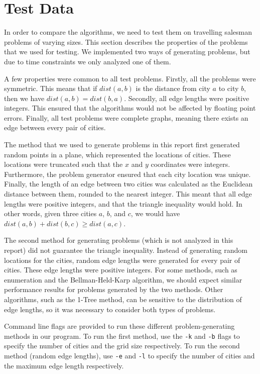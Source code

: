\documentclass[11pt]{article}
\begin{document}
\section{Test Data}
\label{sec:data}

In order to compare the algorithms, we need to test them on travelling salesman problems of varying sizes. This section describes the properties of the problems that we used for testing. We implemented two ways of generating problems, but due to time constraints we only analyzed one of them.

A few properties were common to all test problems. Firstly, all the problems were symmetric. This means that if $dist(a,b)$ is the distance from city $a$ to city $b$, then we have $dist(a,b) = dist(b,a)$. Secondly, all edge lengths were positive integers. This ensured that the algorithms would not be affected by floating point errors. Finally, all test problems were complete graphs, meaning there exists an edge between every pair of cities.

The method that we used to generate problems in this report first generated random points in a plane, which represented the locations of cities. These locations were truncated such that the $x$ and $y$ coordinates were integers. Furthermore, the problem generator ensured that each city location was unique. Finally, the length of an edge between two cities was calculated as the Euclidean distance between them, rounded to the nearest integer. This meant that all edge lengths were positive integers, and that the triangle inequality would hold. In other words, given three cities $a$, $b$, and $c$, we would have $dist(a,b) + dist(b,c) \geq dist(a,c)$.

The second method for generating problems (which is not analyzed in this report) did not guarantee the triangle inequality. Instead of generating random locations for the cities, random edge lengths were generated for every pair of cities. These edge lengths were positive integers. For some methods, such as enumeration and the Bellman-Held-Karp algorithm, we should expect similar performance results for problems generated by the two methods. Other algorithms, such as the 1-Tree method, can be sensitive to the distribution of edge lengths, so it was necessary to consider both types of problems.

Command line flags are provided to run these different problem-generating methods in our program. To run the first method, use the \texttt{-k} and \texttt{-b} flags to specify the number of cities and the grid size respectively. To run the second method (random edge lengths), use \texttt{-e} and \texttt{-l} to specify the number of cities and the maximum edge length respectively.
\end{document}
